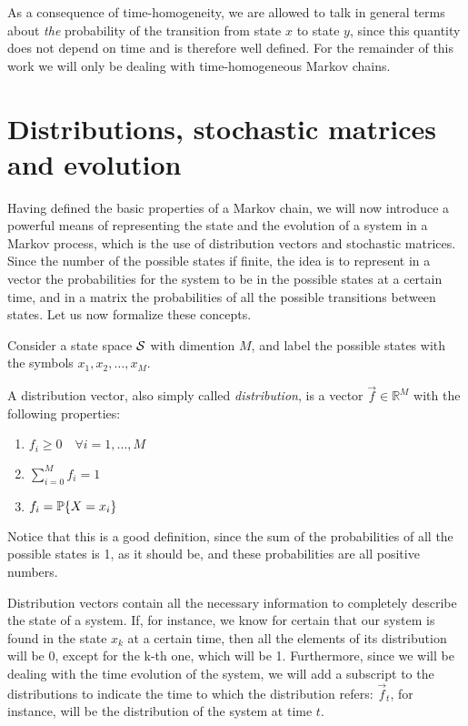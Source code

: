 As a consequence of time-homogeneity, we are allowed to talk in general terms about \emph{the} probability of the transition from state $x$ to state $y$, since this quantity does not depend on time and is therefore well defined. For the remainder of this work we will only be dealing with time-homogeneous Markov chains.

\section{Distributions, stochastic matrices and evolution}
Having defined the basic properties of a Markov chain, we will now introduce a powerful means of representing the state and the evolution of a system in a Markov process, which is the use of distribution vectors and stochastic matrices. Since the number of the possible states if finite, the idea is to represent in a vector the probabilities for the system to be in the possible states at a certain time, and in a matrix the probabilities of all the possible transitions between states. Let us now formalize these concepts.

\smallskip
Consider a state space $\mathcal{S}$ with dimention $M$, and label the possible states with the symbols $x_1, x_2, \dots, x_M$.

\begin{ndef}
    A distribution vector, also simply called \emph{distribution}, is a vector $\vec{f} \in \mathbb{R}^M$ with the following properties:
    \begin{center}
        \begin{enumerate}
            \item $f_i \geq 0 \quad \forall i = 1,\dots, M$
            \item $\sum_{i=0}^M f_i = 1$
            \item $f_i = \mathbb{P}\{X = x_i\}$
        \end{enumerate}
    \end{center}
    Notice that this is a good definition, since the sum of the probabilities of all the possible states is 1, as it should be, and these probabilities are all positive numbers.
\end{ndef}

Distribution vectors contain all the necessary information to completely describe the state of a system. If, for instance, we know for certain that our system is found in the state $x_k$ at a certain time, then all the elements of its distribution will be 0, except for the k-th one, which will be 1. 
Furthermore, since we will be dealing with the time evolution of the system, we will add a subscript to the distributions to indicate the time to which the distribution refers: $\vec{f}_t$, for instance, will be the distribution of the system at time $t$.

